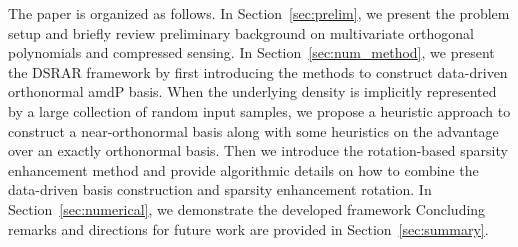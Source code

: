 The paper is organized as follows.
In Section~\ref{sec:prelim}, we present the problem setup and briefly review preliminary background on multivariate orthogonal polynomials and compressed sensing.
In Section~\ref{sec:num_method}, we present the \ac{DSRAR} framework by first introducing 
the methods to construct data-driven orthonormal \ac{amdP} basis. When the underlying density is implicitly represented by a large 
collection of random input samples, we propose a heuristic approach to construct a near-orthonormal basis  along with some heuristics on the advantage over an exactly orthonormal basis.
Then we introduce the rotation-based sparsity enhancement method and provide algorithmic details on how to combine the data-driven basis construction and sparsity enhancement rotation.
In Section~\ref{sec:numerical}, we demonstrate the developed framework 
%
Concluding remarks and directions for future work are provided in Section~\ref{sec:summary}.


